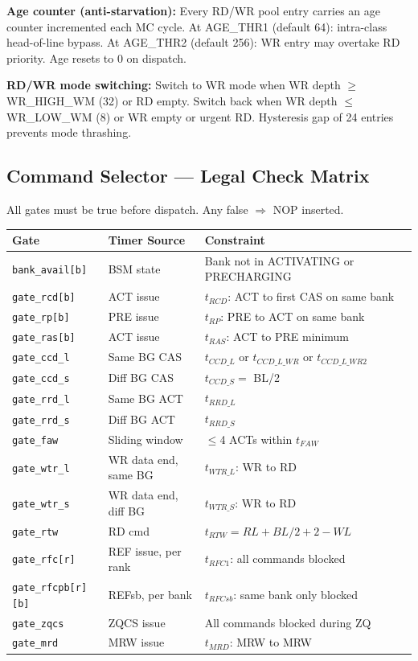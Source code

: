 \documentclass[10pt,a4paper]{article}
\newcommand{\Th}[1]{\cellcolor{cellbg}\textbf{\small #1}}
\newcommand{\RA}{\rowcolor{white}}
\newcommand{\RB}{\rowcolor{altbg}}
\begin{document}
\textbf{Age counter (anti-starvation):} Every RD/WR pool entry carries an age counter incremented
each MC cycle. At AGE\_THR1 (default 64): intra-class head-of-line bypass. At AGE\_THR2
(default 256): WR entry may overtake RD priority. Age resets to 0 on dispatch.

\textbf{RD/WR mode switching:} Switch to WR mode when WR depth $\geq$ WR\_HIGH\_WM (32) or RD
empty. Switch back when WR depth $\leq$ WR\_LOW\_WM (8) or WR empty or urgent RD.
Hysteresis gap of 24 entries prevents mode thrashing.

\subsection{Command Selector --- Legal Check Matrix}

All gates must be true before dispatch. Any false $\Rightarrow$ NOP inserted.

\begin{center}
\begin{tabularx}{\linewidth}{@{} l l X @{}}
\toprule
\Th{Gate} & \Th{Timer Source} & \Th{Constraint} \\
\midrule
\RA \texttt{bank\_avail[b]} & BSM state & Bank not in ACTIVATING or PRECHARGING \\
\RB \texttt{gate\_rcd[b]} & ACT issue & $t_{RCD}$: ACT to first CAS on same bank \\
\RA \texttt{gate\_rp[b]} & PRE issue & $t_{RP}$: PRE to ACT on same bank \\
\RB \texttt{gate\_ras[b]} & ACT issue & $t_{RAS}$: ACT to PRE minimum \\
\RA \texttt{gate\_ccd\_l} & Same BG CAS & $t_{CCD\_L}$ or $t_{CCD\_L\_WR}$ or $t_{CCD\_L\_WR2}$ \\
\RB \texttt{gate\_ccd\_s} & Diff BG CAS & $t_{CCD\_S} = $ BL/2 \\
\RA \texttt{gate\_rrd\_l} & Same BG ACT & $t_{RRD\_L}$ \\
\RB \texttt{gate\_rrd\_s} & Diff BG ACT & $t_{RRD\_S}$ \\
\RA \texttt{gate\_faw} & Sliding window & $\leq$4 ACTs within $t_{FAW}$ \\
\RB \texttt{gate\_wtr\_l} & WR data end, same BG & $t_{WTR\_L}$: WR to RD \\
\RA \texttt{gate\_wtr\_s} & WR data end, diff BG & $t_{WTR\_S}$: WR to RD \\
\RB \texttt{gate\_rtw} & RD cmd & $t_{RTW} = RL + BL/2 + 2 - WL$ \\
\RA \texttt{gate\_rfc[r]} & REF issue, per rank & $t_{RFC1}$: all commands blocked \\
\RB \texttt{gate\_rfcpb[r][b]} & REFsb, per bank & $t_{RFCsb}$: same bank only blocked \\
\RA \texttt{gate\_zqcs} & ZQCS issue & All commands blocked during ZQ \\
\RB \texttt{gate\_mrd} & MRW issue & $t_{MRD}$: MRW to MRW \\
\bottomrule
\end{tabularx}
\end{center}
\end{document}
